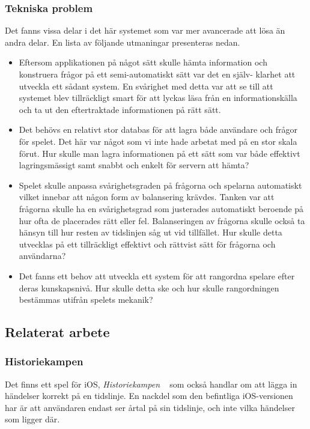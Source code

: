 \documentclass[a4paper, 11pt]{article}
\begin{document}
\subsubsection{Tekniska problem}
Det fanns vissa delar i det här systemet som var mer avancerade att lösa än andra delar. En lista av följande utmaningar presenteras nedan.
\begin{itemize}
\item Eftersom applikationen på något sätt skulle hämta information och konstruera frågor på ett semi-automatiskt sätt var det en själv-
klarhet att utveckla ett sådant system. En svårighet med detta var att se till att systemet blev tillräckligt smart för att lyckas läsa från en informationskälla och ta ut den eftertraktade informationen på rätt sätt.
\item Det behövs en relativt stor databas för att lagra både användare och frågor för spelet. Det här var något som vi inte hade arbetat med på en stor skala förut. Hur skulle man lagra informationen på ett sätt som var både effektivt lagringsmässigt samt snabbt och enkelt för servern att hämta?
\item Spelet skulle anpassa svårighetsgraden på frågorna och spelarna automatiskt vilket innebar att någon form av balansering krävdes. Tanken var att frågorna skulle ha en svårighetsgrad som justerades automatiskt beroende på hur ofta de placerades rätt eller fel. Balanseringen av frågorna skulle också ta hänsyn till hur resten av tidslinjen såg ut vid tillfället. Hur skulle detta utvecklas på ett tillräckligt effektivt och rättvist sätt för frågorna och användarna?
\item Det fanns ett behov att utveckla ett system för att rangordna spelare efter deras kunskapsnivå. Hur skulle detta ske och hur skulle rangordningen bestämmas utifrån spelets mekanik? 
\end{itemize}

\subsection{Relaterat arbete}

\subsubsection{Historiekampen} \label{Historiekampen}
Det finns ett spel för iOS, \textit{Historiekampen} ~\cite{historiekampen} som också handlar om att lägga in händelser korrekt på en tidslinje. En nackdel som den befintliga iOS-versionen har är att användaren endast ser årtal på sin tidslinje, och inte vilka händelser som ligger där.
\end{document}
